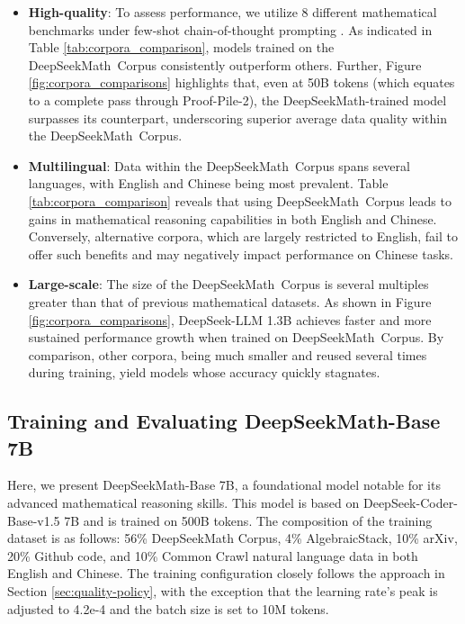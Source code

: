\begin{itemize}[topsep=0pt]
    \item \textbf{High-quality}:
    To assess performance, we utilize 8 different mathematical benchmarks under few-shot chain-of-thought prompting \cite{cot}. As indicated in Table \ref{tab:corpora_comparison}, models trained on the DeepSeekMath~Corpus consistently outperform others. Further, Figure \ref{fig:corpora_comparisons} highlights that, even at 50B tokens (which equates to a complete pass through Proof-Pile-2), the DeepSeekMath-trained model surpasses its counterpart, underscoring superior average data quality within the DeepSeekMath~Corpus.
    \item \textbf{Multilingual}:
    Data within the DeepSeekMath~Corpus spans several languages, with English and Chinese being most prevalent. Table \ref{tab:corpora_comparison} reveals that using DeepSeekMath~Corpus leads to gains in mathematical reasoning capabilities in both English and Chinese. Conversely, alternative corpora, which are largely restricted to English, fail to offer such benefits and may negatively impact performance on Chinese tasks.
    \item \textbf{Large-scale}:
    The size of the DeepSeekMath~Corpus is several multiples greater than that of previous mathematical datasets. As shown in Figure \ref{fig:corpora_comparisons}, DeepSeek-LLM 1.3B achieves faster and more sustained performance growth when trained on DeepSeekMath~Corpus. By comparison, other corpora, being much smaller and reused several times during training, yield models whose accuracy quickly stagnates.
\end{itemize}

\subsection{Training and Evaluating DeepSeekMath-Base 7B}

Here, we present DeepSeekMath-Base 7B, a foundational model notable for its advanced mathematical reasoning skills. This model is based on DeepSeek-Coder-Base-v1.5 7B \citep{deepseek-coder} and is trained on 500B tokens. The composition of the training dataset is as follows: 56\% DeepSeekMath Corpus, 4\% AlgebraicStack, 10\% arXiv, 20\% Github code, and 10\% Common Crawl natural language data in both English and Chinese. The training configuration closely follows the approach in Section \ref{sec:quality-policy}, with the exception that the learning rate's peak is adjusted to 4.2e-4 and the batch size is set to 10M tokens.

